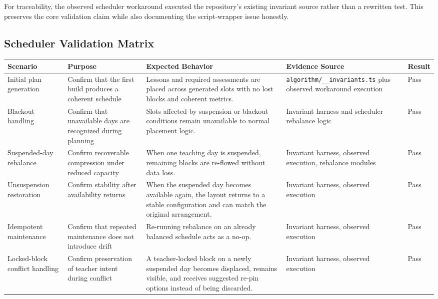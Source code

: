 \documentclass[12pt]{article}
\begin{document}
For traceability, the observed scheduler workaround executed the repository's existing invariant source rather than a rewritten test. This preserves the core validation claim while also documenting the script-wrapper issue honestly.

\subsection{Scheduler Validation Matrix}

\begin{longtable}{|L{2.9cm}|L{3.1cm}|L{4.6cm}|L{3.2cm}|L{1.5cm}|}
\hline
\textbf{Scenario} & \textbf{Purpose} & \textbf{Expected Behavior} & \textbf{Evidence Source} & \textbf{Result} \\
\hline
Initial plan generation & Confirm that the first build produces a coherent schedule & Lessons and required assessments are placed across generated slots with no lost blocks and coherent metrics. & \nolinkurl{algorithm/__invariants.ts} plus observed workaround execution & Pass \\
\hline
Blackout handling & Confirm that unavailable days are recognized during planning & Slots affected by suspension or blackout conditions remain unavailable to normal placement logic. & Invariant harness and scheduler rebalance logic & Pass \\
\hline
Suspended-day rebalance & Confirm recoverable compression under reduced capacity & When one teaching day is suspended, remaining blocks are re-flowed without data loss. & Invariant harness, observed execution, rebalance modules & Pass \\
\hline
Unsuspension restoration & Confirm stability after availability returns & When the suspended day becomes available again, the layout returns to a stable configuration and can match the original arrangement. & Invariant harness, observed execution & Pass \\
\hline
Idempotent maintenance & Confirm that repeated maintenance does not introduce drift & Re-running rebalance on an already balanced schedule acts as a no-op. & Invariant harness, observed execution & Pass \\
\hline
Locked-block conflict handling & Confirm preservation of teacher intent during conflict & A teacher-locked block on a newly suspended day becomes displaced, remains visible, and receives suggested re-pin options instead of being discarded. & Invariant harness, observed execution & Pass \\
\hline
\end{longtable}
\end{document}
